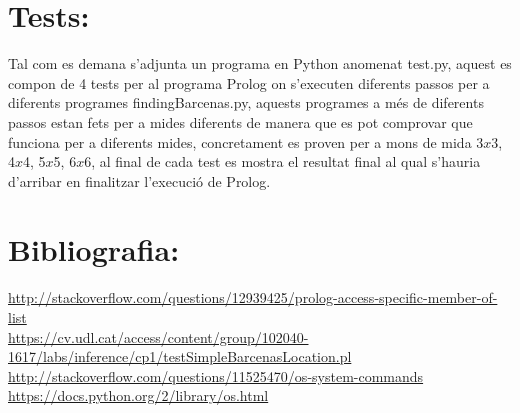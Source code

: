 \documentclass[11pt]{article}
\begin{document}
\section{Tests:}
Tal com es demana s'adjunta un programa en Python anomenat test.py, aquest es compon de 4 tests per al programa Prolog on s'executen diferents passos per a diferents programes findingBarcenas.py, aquests programes a més de diferents passos estan fets per a mides diferents de manera que es pot comprovar que funciona per a diferents mides, concretament es proven per a mons de mida 3$x$3, 4$x$4, 5$x$5, 6$x$6, al final de cada test es mostra el resultat final al qual s'hauria d'arribar en finalitzar l'execució de Prolog.
\section{Bibliografia:} 
\url{http://stackoverflow.com/questions/12939425/prolog-access-specific-member-of-list}\\
\url{https://cv.udl.cat/access/content/group/102040-1617/labs/inference/cp1/testSimpleBarcenasLocation.pl}\\
\url{http://stackoverflow.com/questions/11525470/os-system-commands}\\
\url{https://docs.python.org/2/library/os.html}
\end{document}
